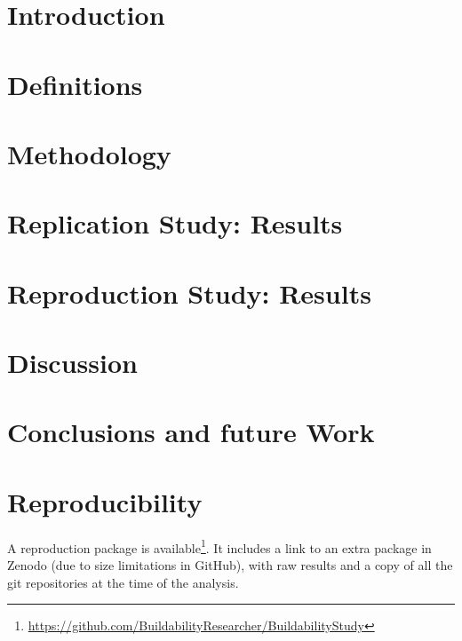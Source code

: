 \minitoc

\section{Introduction}
\label{sec:buildability:intro}


% 

\section{Definitions}
\label{sec:buildability:definitions}


\section{Methodology}
\label{sec:buildability:metodology}


\section{Replication Study: Results}
\label{sec:buildability:results-repli}


\section{Reproduction Study: Results}
\label{sec:buildability:results-repro}
 

\section{Discussion}
\label{sec:buildability:discussion}


\section{Conclusions and future Work}
\label{sec:buildability:conclusions}


\section*{Reproducibility}
\label{sec:buildability:repro}

A reproduction package is available\footnote{\url{https://github.com/BuildabilityResearcher/BuildabilityStudy}}. It includes a link to an extra package in Zenodo (due to size limitations in GitHub), with raw results and a copy of all the git repositories at the time of the analysis.

